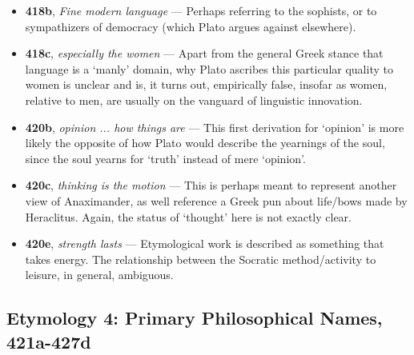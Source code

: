 \documentclass[12pt]{article}
\begin{document}
\begin{itemize}
\item \textbf{418b}, \textit{Fine modern language} --- Perhaps referring to the sophists, or to sympathizers of democracy (which Plato argues against elsewhere).

\item \textbf{418c}, \textit{especially the women} --- Apart from the general Greek stance that language is a `manly' domain, why Plato ascribes this particular quality to women is unclear and is, it turns out, empirically false, insofar as women, relative to men, are usually on the vanguard of linguistic innovation.

\item \textbf{420b}, \textit{opinion ... how things are} --- This first derivation for `opinion' is more likely the opposite of how Plato would describe the yearnings of the soul, since the soul yearns for `truth' instead of mere `opinion'.

\item \textbf{420c}, \textit{thinking is the motion} --- This is perhaps meant to represent another view of Anaximander, as well reference a Greek pun about life/bows made by Heraclitus. Again, the status of `thought' here is not exactly clear.

\item \textbf{420e}, \textit{strength lasts} --- Etymological work is described as something that takes energy. The relationship between the Socratic method/activity to leisure, in general, ambiguous.

\end{itemize}

\subsection{Etymology 4: Primary Philosophical Names, 421a-427d}
\end{document}
